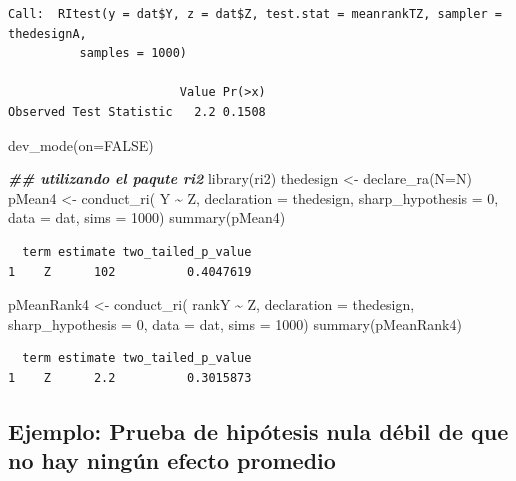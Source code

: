 \documentclass[
]{article}
\newenvironment{Shaded}{\begin{snugshade}}{\end{snugshade}}
\newcommand{\AttributeTok}[1]{\textcolor[rgb]{0.77,0.63,0.00}{#1}}
\newcommand{\ConstantTok}[1]{\textcolor[rgb]{0.00,0.00,0.00}{#1}}
\newcommand{\DecValTok}[1]{\textcolor[rgb]{0.00,0.00,0.81}{#1}}
\newcommand{\DocumentationTok}[1]{\textcolor[rgb]{0.56,0.35,0.01}{\textbf{\textit{#1}}}}
\newcommand{\FunctionTok}[1]{\textcolor[rgb]{0.00,0.00,0.00}{#1}}
\newcommand{\NormalTok}[1]{#1}
\newcommand{\OtherTok}[1]{\textcolor[rgb]{0.56,0.35,0.01}{#1}}
\newcommand{\SpecialCharTok}[1]{\textcolor[rgb]{0.00,0.00,0.00}{#1}}
\begin{document}
\begin{verbatim}
Call:  RItest(y = dat$Y, z = dat$Z, test.stat = meanrankTZ, sampler = thedesignA,  
          samples = 1000)

                        Value Pr(>x)
Observed Test Statistic   2.2 0.1508
\end{verbatim}

\begin{Shaded}
\begin{Highlighting}[]
\FunctionTok{dev\_mode}\NormalTok{(}\AttributeTok{on=}\ConstantTok{FALSE}\NormalTok{)}

\DocumentationTok{\#\# utilizando el paqute ri2}
\FunctionTok{library}\NormalTok{(ri2)}
\NormalTok{thedesign }\OtherTok{\textless{}{-}} \FunctionTok{declare\_ra}\NormalTok{(}\AttributeTok{N=}\NormalTok{N)}
\NormalTok{pMean4 }\OtherTok{\textless{}{-}} \FunctionTok{conduct\_ri}\NormalTok{( Y }\SpecialCharTok{\textasciitilde{}}\NormalTok{ Z, }\AttributeTok{declaration =}\NormalTok{ thedesign, }
             \AttributeTok{sharp\_hypothesis =} \DecValTok{0}\NormalTok{, }\AttributeTok{data =}\NormalTok{ dat, }\AttributeTok{sims =} \DecValTok{1000}\NormalTok{)}
\FunctionTok{summary}\NormalTok{(pMean4)}
\end{Highlighting}
\end{Shaded}

\begin{verbatim}
  term estimate two_tailed_p_value
1    Z      102          0.4047619
\end{verbatim}

\begin{Shaded}
\begin{Highlighting}[]
\NormalTok{pMeanRank4 }\OtherTok{\textless{}{-}} \FunctionTok{conduct\_ri}\NormalTok{( rankY }\SpecialCharTok{\textasciitilde{}}\NormalTok{ Z, }\AttributeTok{declaration =}\NormalTok{ thedesign, }
             \AttributeTok{sharp\_hypothesis =} \DecValTok{0}\NormalTok{, }\AttributeTok{data =}\NormalTok{ dat, }\AttributeTok{sims =} \DecValTok{1000}\NormalTok{)}
\FunctionTok{summary}\NormalTok{(pMeanRank4)}
\end{Highlighting}
\end{Shaded}

\begin{verbatim}
  term estimate two_tailed_p_value
1    Z      2.2          0.3015873
\end{verbatim}

\hypertarget{ejemplo-prueba-de-hipuxf3tesis-nula-duxe9bil-de-que-no-hay-ninguxfan-efecto-promedio}{%
\subsection{Ejemplo: Prueba de hipótesis nula débil de que no hay ningún efecto promedio}\label{ejemplo-prueba-de-hipuxf3tesis-nula-duxe9bil-de-que-no-hay-ninguxfan-efecto-promedio}}
\end{document}
